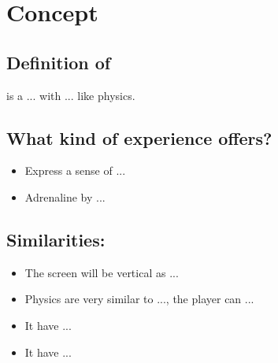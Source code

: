 %
%
%

\section{\projectname \space Concept}


\subsection{Definition of \projectname}
\projectname is a ... with ... like physics.


\subsection{What kind of experience \projectname \space offers?}
\begin{itemize}
\item Express a sense of ...
\item Adrenaline by ...
\end{itemize}


\subsection{Similarities:}
\begin{itemize}

\item The screen will be vertical as ...
\item Physics are very similar to ..., the player can ...
\item It have ...
\item It have ...

\end{itemize}
